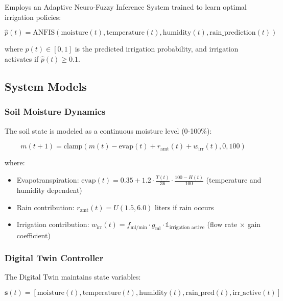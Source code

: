 Employs an Adaptive Neuro-Fuzzy Inference System trained to learn optimal irrigation policies:

\begin{equation}
\hat{p}(t) = \text{ANFIS}(\text{moisture}(t), \text{temperature}(t), \text{humidity}(t), \text{rain\_prediction}(t))
\end{equation}

where $\hat{p}(t) \in [0,1]$ is the predicted irrigation probability, and irrigation activates if $\hat{p}(t) \geq 0.1$.

\subsection{System Models}

\subsubsection{Soil Moisture Dynamics}

The soil state is modeled as a continuous moisture level (0-100\%):

\begin{equation}
m(t+1) = \text{clamp}\left(m(t) - \text{evap}(t) + r_{\text{amt}}(t) + w_{\text{irr}}(t), 0, 100\right)
\end{equation}

where:
\begin{itemize}
    \item Evapotranspiration: $\text{evap}(t) = 0.35 + 1.2 \cdot \frac{T(t)}{36} \cdot \frac{100 - H(t)}{100}$ (temperature and humidity dependent)
    \item Rain contribution: $r_{\text{amt}}(t) = U(1.5, 6.0)$ liters if rain occurs
    \item Irrigation contribution: $w_{\text{irr}}(t) = f_{\text{ml/min}} \cdot g_{\text{ml}} \cdot \mathbb{1}_{\text{irrigation active}}$ (flow rate × gain coefficient)
\end{itemize}

\subsubsection{Digital Twin Controller}

The Digital Twin maintains state variables:

\begin{equation}
\mathbf{s}(t) = [\text{moisture}(t), \text{temperature}(t), \text{humidity}(t), \text{rain\_pred}(t), \text{irr\_active}(t)]
\end{equation}

